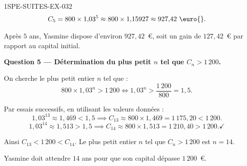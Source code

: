 \begin{corrige}{1SPE-SUITES-EX-032}
\[
  C_5 = 800 \times 1{,}03^5 \approx 800 \times 1{,}15927 \approx 927{,}42 \text{ \euro{}}.
\]

Après $5$ ans, Yasmine dispose d'environ $927{,}42$~\euro{}, soit un gain de $127{,}42$~\euro{} par rapport au capital initial.

\medskip
\textbf{Question 5 — Détermination du plus petit $n$ tel que $C_n > 1\,200$.}

On cherche le plus petit entier $n$ tel que :
\[
  800 \times 1{,}03^n > 1\,200 \iff 1{,}03^n > \frac{1\,200}{800} = 1{,}5.
\]


Par essais successifs, en utilisant les valeurs données :
\[
  1{,}03^{13} \approx 1{,}469 < 1{,}5 \implies C_{13} \approx 800 \times 1{,}469 = 1\,175{,}20 < 1\,200.
\]
\[
  1{,}03^{14} \approx 1{,}513 > 1{,}5 \implies C_{14} \approx 800 \times 1{,}513 = 1\,210{,}40 > 1\,200. \checkmark
\]

Ainsi $C_{13} < 1\,200 < C_{14}$. Le plus petit entier $n$ tel que $C_n > 1\,200$ est $\boxed{n = 14}$.

Yasmine doit attendre $14$ ans pour que son capital dépasse $1\,200$~\euro{}.

\end{corrige}
